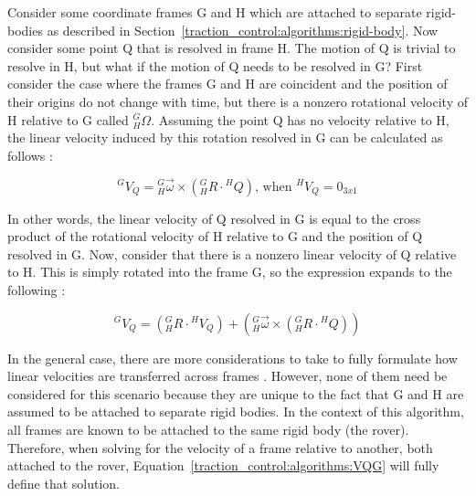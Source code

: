 Consider some coordinate frames G and H which are attached to separate rigid-bodies as described in Section~\ref{traction_control:algorithms:rigid-body}. Now consider some point Q that is resolved in frame H. The motion of Q is trivial to resolve in H, but what if the motion of Q needs to be resolved in G? First consider the case where the frames G and H are coincident and the position of their origins do not change with time, but there is a nonzero rotational velocity of H relative to G called ${}^{G}_{H}\Omega$. Assuming the point Q has no velocity relative to H, the linear velocity induced by this rotation resolved in G can be calculated as follows \cite{craig}:

\begin{equation}
	{}^{G}V_{Q} = {}^{G}_{H}\vec{\omega} \times \left({}^{G}_{H}R \cdot {}^{H}Q\right) \text{, when } {}^{H}V_{Q} = 0_{3x1}
\end{equation}

In other words, the linear velocity of Q resolved in G is equal to the cross product of the rotational velocity of H relative to G and the position of Q resolved in G. Now, consider that there is a nonzero linear velocity of Q relative to H. This is simply rotated into the frame G, so the expression expands to the following \cite{craig}:

\begin{equation}\label{traction_control:algorithms:VQG}
	{}^{G}V_{Q} = \left({}^{G}_{H}R \cdot {}^{H}V_{Q}\right) + \left({}^{G}_{H}\vec{\omega} \times \left({}^{G}_{H}R \cdot {}^{H}Q\right)\right)
\end{equation}

In the general case, there are more considerations to take to fully formulate how linear velocities are transferred across frames \cite{craig}. However, none of them need be considered for this scenario because they are unique to the fact that G and H are assumed to be attached to separate rigid bodies. In the context of this algorithm, all frames are known to be attached to the same rigid body (the rover). Therefore, when solving for the velocity of a frame relative to another, both attached to the rover, Equation~\ref{traction_control:algorithms:VQG} will fully define that solution.
